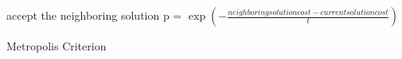 \begin{algorithm2e}[h]
	{
		accept the neighboring solution\;
	}
	{
		p = $\exp{\left( -\frac{neighboring solution cost-current solution cost}{t} \right)}$\;
	}
	\caption{Metropolis Criterion}
	\label{algo:metropolis_criterion}
\end{algorithm2e}